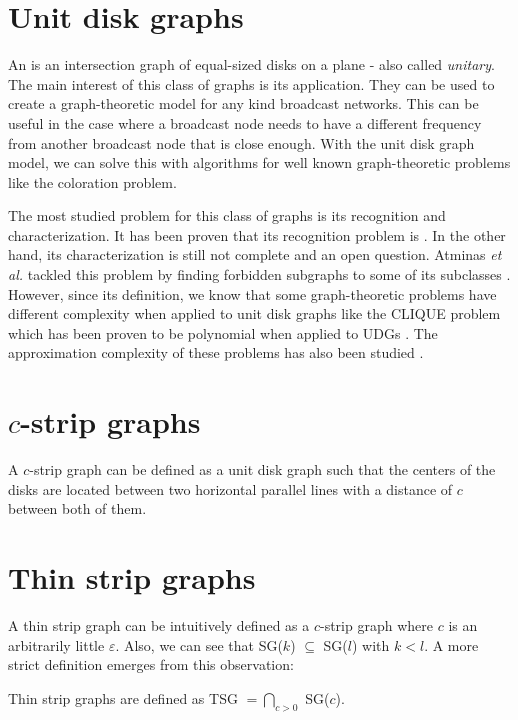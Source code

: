 \section{Unit disk graphs}

An \emph{} is an intersection graph of equal-sized disks on a plane - also called \emph{unitary}. The main interest of this class of graphs is its application. They can be used to create a graph-theoretic model for any kind broadcast networks. This can be useful in the case where a broadcast node needs to have a different frequency from another broadcast node that is close enough. With the unit disk graph model, we can solve this with algorithms for well known graph-theoretic problems like the coloration problem.

The most studied problem for this class of graphs is its recognition and characterization. It has been proven that its recognition problem is  \cite{Schaefer2013}. In the other hand, its characterization is still not complete and an open question. Atminas \textit{et al.} tackled this problem by finding forbidden subgraphs to some of its subclasses \cite{atminasForbiddenInducedSubgraphs2016}. However, since its definition, we know that some graph-theoretic problems have different complexity when applied to unit disk graphs like the CLIQUE problem which has been proven to be polynomial when applied to UDGs \cite{CLARK1990165}. The approximation complexity of these problems has also been studied \cite{DBLP:journals/corr/abs-1712-05010}.

\section{$c$-strip graphs}

A $c$-strip graph can be defined as a unit disk graph such that the centers of the disks are located between two horizontal parallel lines with a distance of $c$ between both of them.


\section{Thin strip graphs}

A thin strip graph can be intuitively defined as a $c$-strip graph where $c$ is an arbitrarily little $\varepsilon$. Also, we can see that SG($k$) $\subseteq$ SG($l$) with $k<l$. A more strict definition emerges from this observation:

\begin{defn}
  Thin strip graphs are defined as TSG $= \bigcap_{c > 0}$ SG($c$).
\end{defn}

